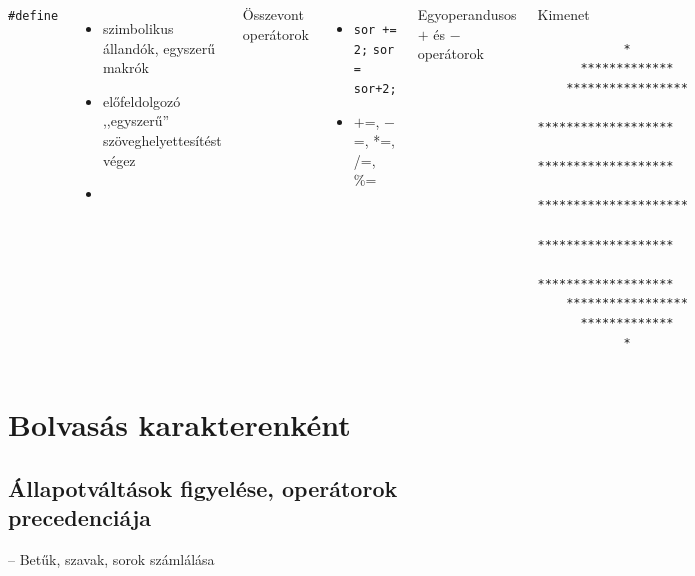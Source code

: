 \documentclass[usenames,dvipsnames,aspectratio=169]{beamer}
\begin{document}
\begin{frame}[fragile]
  \begin{columns}[c]
    \texttt{\#define}
    \begin{itemize}
      \small
      \item szimbolikus állandók, egyszerű makrók
      \item előfeldolgozó ,,egyszerű'' szöveghelyettesítést végez
      \item {}
    \end{itemize}
    \vfill
    Összevont operátorok
    \begin{itemize}
      \small
      \item \texttt{sor += 2;} \kiemel{$\equiv$} \texttt{sor = sor+2;}
      \item $+$=, $-$=, *=, /=, \%=
    \end{itemize}
    \vfill
    Egyoperandusos $+$ és $-$ operátorok
    \begin{block}{Kimenet}
      \vspace{-.3cm}
      \begin{verbatim}
            *          
      *************    
    *****************  
   ******************* 
   ******************* 
  *********************
   ******************* 
   ******************* 
    *****************  
      *************    
            *
\end{verbatim}
      \vspace{-.3cm}
    \end{block}
  \end{columns}
\end{frame}

\section{Bolvasás karakterenként}
\subsection{Állapotváltások figyelése, operátorok precedenciája}
\begin{frame}
  \begin{exampleblock}{ -- Betűk, szavak, sorok számlálása}
    \tiny
    
  \end{exampleblock}
\end{frame}
\end{document}
